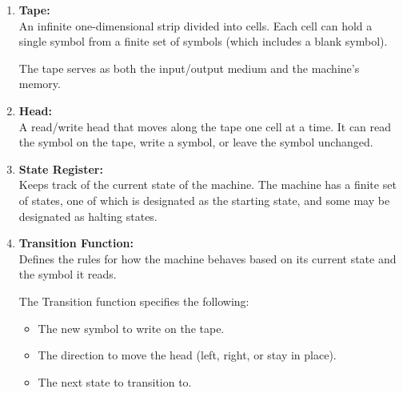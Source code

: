 \begin{enumerate}
    \item \textbf{Tape:} \\
    An infinite one-dimensional strip divided into cells. Each cell can hold a single symbol from a finite set of symbols (which includes a blank symbol).

    The tape serves as both the input/output medium and the machine's memory.

    \item \textbf{Head:} \\
    A read/write head that moves along the tape one cell at a time.
    It can read the symbol on the tape, write a symbol, or leave the symbol unchanged.

    \item \textbf{State Register:} \\
    Keeps track of the current state of the machine.
    The machine has a finite set of states, one of which is designated as the starting state, and some may be designated as halting states.

    \item \textbf{Transition Function:} \\
    Defines the rules for how the machine behaves based on its current state and the symbol it reads.

    The Transition function specifies the following:
    \begin{itemize}
        \item The new symbol to write on the tape.
        \item The direction to move the head (left, right, or stay in place).
        \item The next state to transition to.
    \end{itemize}
\end{enumerate}

